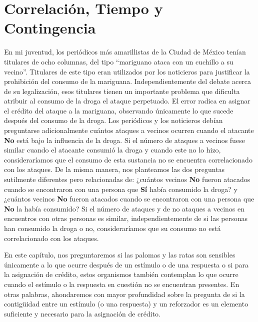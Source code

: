 \documentclass[
  letterpaper,
]{book}
\begin{document}

\chapter{Correlación, Tiempo y
Contingencia}\label{correlaciuxf3n-tiempo-y-contingencia}

En mi juventud, los periódicos más amarillistas de la Ciudad de México
tenían titulares de ocho columnas, del tipo ``mariguano ataca con un
cuchillo a su vecino''. Titulares de este tipo eran utilizados por los
noticieros para justificar la prohibición del consumo de la mariguana.
Independientemente del debate acerca de su legalización, esos titulares
tienen un importante problema que dificulta atribuir al consumo de la
droga el ataque perpetuado. El error radica en asignar el crédito del
ataque a la mariguana, observando únicamente lo que sucede después del
consumo de la droga. Los periódicos y los noticieros debían preguntarse
adicionalmente cuántos ataques a vecinos ocurren cuando el atacante
\textbf{No} está bajo la influencia de la droga. Si el número de ataques
a vecinos fuese similar cuando el atacante consumió la droga y cuando
este no lo hizo, consideraríamos que el consumo de esta sustancia no se
encuentra correlacionado con los ataques. De la misma manera, nos
planteamos las dos preguntas sutilmente diferentes pero relacionadas de:
¿cuántos vecinos \textbf{No} fueron atacados cuando se encontraron con
una persona que \textbf{Sí} había consumido la droga? y ¿cuántos vecinos
\textbf{No} fueron atacados cuando se encontraron con una persona que
\textbf{No} la había consumido? Si el número de ataques y de no ataques
a vecinos en encuentros con otras personas es similar,
independientemente de si las personas han consumido la droga o no,
consideraríamos que su consumo no está correlacionado con los ataques.

En este capítulo, nos preguntaremos si las palomas y las ratas son
sensibles únicamente a lo que ocurre después de un estímulo o de una
respuesta o si para la asignación de crédito, estos organismos también
contemplan lo que ocurre cuando el estímulo o la respuesta en cuestión
no se encuentran presentes. En otras palabras, ahondaremos con mayor
profundidad sobre la pregunta de si la contigüidad entre un estímulo (o
una respuesta) y un reforzador es un elemento suficiente y necesario
para la asignación de crédito.
\end{document}
